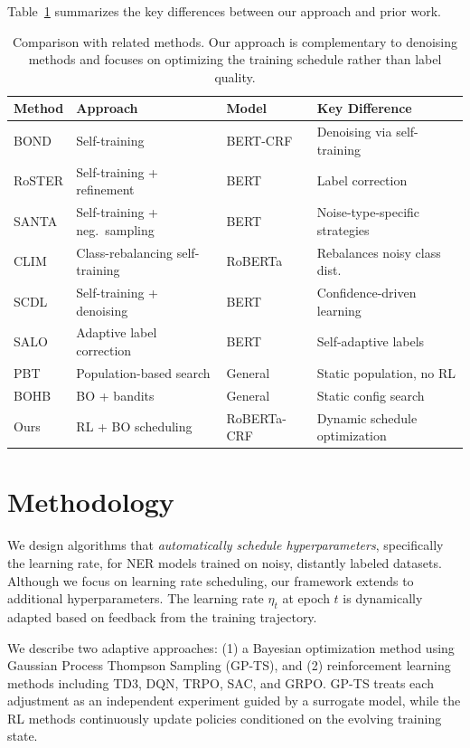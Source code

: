 \documentclass[11pt]{article}
\begin{document}
Table~\ref{tab:related-work} summarizes the key differences between our approach and prior work.

\begin{table}[t]
\centering
\small
\begin{tabular}{@{}llll@{}}
\toprule
\textbf{Method} & \textbf{Approach} & \textbf{Model} & \textbf{Key Difference} \\
\midrule
BOND & Self-training & BERT-CRF & Denoising via self-training \\
RoSTER & Self-training + refinement & BERT & Label correction \\
SANTA & Self-training + neg.\ sampling & BERT & Noise-type-specific strategies \\
CLIM & Class-rebalancing self-training & RoBERTa & Rebalances noisy class dist. \\
SCDL & Self-training + denoising & BERT & Confidence-driven learning \\
SALO & Adaptive label correction & BERT & Self-adaptive labels \\
PBT & Population-based search & General & Static population, no RL \\
BOHB & BO + bandits & General & Static config search \\
\midrule
Ours & RL + BO scheduling & RoBERTa-CRF & Dynamic schedule optimization \\
\bottomrule
\end{tabular}
\caption{Comparison with related methods. Our approach is complementary to denoising methods and focuses on optimizing the training schedule rather than label quality.}
\label{tab:related-work}
\end{table}

\section{Methodology}

We design algorithms that \textit{automatically schedule hyperparameters}, specifically the learning rate, for NER models trained on noisy, distantly labeled datasets. Although we focus on learning rate scheduling, our framework extends to additional hyperparameters. The learning rate $\eta_t$ at epoch $t$ is dynamically adapted based on feedback from the training trajectory.

We describe two adaptive approaches: (1) a Bayesian optimization method using Gaussian Process Thompson Sampling (GP-TS), and (2) reinforcement learning methods including TD3, DQN, TRPO, SAC, and GRPO. GP-TS treats each adjustment as an independent experiment guided by a surrogate model, while the RL methods continuously update policies conditioned on the evolving training state.
\end{document}
